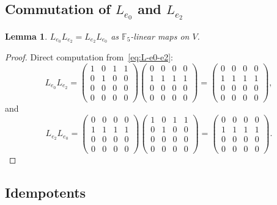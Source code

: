 \documentclass[11pt,reqno]{amsart}
\theoremstyle{plain}
\newtheorem{lemma}[theorem]{Lemma}
\theoremstyle{definition}
\theoremstyle{remark}
\newcommand{\F}{\mathbb{F}}
\begin{document}
\subsection{Commutation of $L_{e_0}$ and $L_{e_2}$}

\begin{lemma} \label{lem:commute}
$L_{e_0} L_{e_2} = L_{e_2} L_{e_0}$ as $\F_5$-linear maps on $V$.
\end{lemma}

\begin{proof}
Direct computation from~\eqref{eq:L-e0-e2}:
\[
L_{e_0} L_{e_2} = \begin{pmatrix}
1 & 0 & 1 & 1 \\
0 & 1 & 0 & 0 \\
0 & 0 & 0 & 0 \\
0 & 0 & 0 & 0
\end{pmatrix}
\begin{pmatrix}
0 & 0 & 0 & 0 \\
1 & 1 & 1 & 1 \\
0 & 0 & 0 & 0 \\
0 & 0 & 0 & 0
\end{pmatrix} = \begin{pmatrix}
0 & 0 & 0 & 0 \\
1 & 1 & 1 & 1 \\
0 & 0 & 0 & 0 \\
0 & 0 & 0 & 0
\end{pmatrix},
\]
and
\[
L_{e_2} L_{e_0} = \begin{pmatrix}
0 & 0 & 0 & 0 \\
1 & 1 & 1 & 1 \\
0 & 0 & 0 & 0 \\
0 & 0 & 0 & 0
\end{pmatrix}
\begin{pmatrix}
1 & 0 & 1 & 1 \\
0 & 1 & 0 & 0 \\
0 & 0 & 0 & 0 \\
0 & 0 & 0 & 0
\end{pmatrix} = \begin{pmatrix}
0 & 0 & 0 & 0 \\
1 & 1 & 1 & 1 \\
0 & 0 & 0 & 0 \\
0 & 0 & 0 & 0
\end{pmatrix}.
\]
\end{proof}

\subsection{Idempotents}
\end{document}
